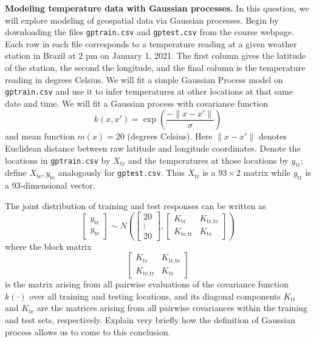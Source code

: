 \documentclass{article}
\begin{document}
\begin{flushleft}
    \textbf{Modeling temperature data with Gaussian processes.} In this question, we will explore modeling of geospatial data via Gaussian processes. 
    Begin by downloading the files \texttt{gptrain.csv} and \texttt{gptest.csv} from the course webpage. 
    Each row in each file corresponds to a temperature reading at a given weather station in Brazil at 2 pm on January 1, 2021. The first column gives the latitude of the station, the second the longitude, and the final column is the temperature reading in degrees Celsius. 
    We will fit a simple Gaussian Process model on \texttt{gptrain.csv} and use it to infer temperatures at other locations at that same date and time. 
    We will fit a Gaussian process with covariance function 
    \[
    k(x, x') = \exp\left(\frac{-\|x-x'\|}{\sigma}\right)
    \]
    and mean function $m(x) = 20$ (degrees Celsius). 
    Here $\|x-x'\|$ denotes Euclidean distance between raw latitude and longitude coordinates. 
    Denote the locations in \texttt{gptrain.csv} by $X_{\text{tr}}$ and the temperatures at those locations by $y_{\text{tr}}$; 
    define $X_{\text{te}}, y_{\text{te}}$ analogously for \texttt{gptest.csv}. Thus $X_{\text{tr}}$ is a $93 \times 2$ matrix while $y_{\text{tr}}$ is a 93-dimensional vector. 
    
    The joint distribution of training and test responses can be written as 
    \[
    \begin{bmatrix} y_{\text{tr}} \\ y_{\text{te}} \end{bmatrix} \sim N\left(\begin{bmatrix} 20 \\ \vdots \\ 20 \end{bmatrix}, \begin{bmatrix} K_{\text{tr}} & K_{\text{tr,te}} \\ K_{\text{te,tr}} & K_{\text{te}} \end{bmatrix}\right)
    \]
    where the block matrix 
    \[
    \begin{bmatrix} K_{\text{tr}} & K_{\text{tr,te}} \\ K_{\text{te,tr}} & K_{\text{te}} \end{bmatrix}
    \]
    is the matrix arising from all pairwise evaluations of the covariance function $k(\cdot)$ over all training and testing locations, and its diagonal components $K_{\text{tr}}$ 
    and $K_{\text{te}}$ are the matrices arising from all pairwise covariances within the training and test sets, respectively. 
    Explain very briefly how the definition of Gaussian process allows us to come to this conclusion. 
\end{flushleft}
\end{document}
